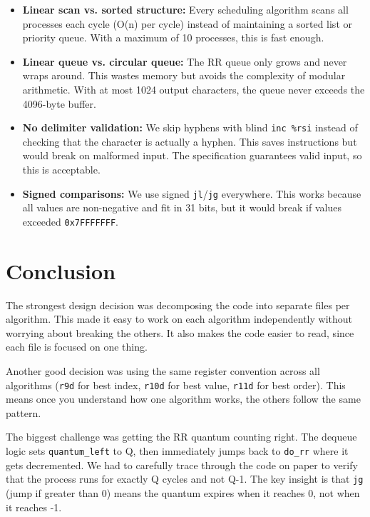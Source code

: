 \documentclass[a4paper,12pt]{article}
\begin{document}
\begin{itemize}
    \item \textbf{Linear scan vs. sorted structure:} Every scheduling algorithm scans all processes each cycle (O(n) per cycle) instead of maintaining a sorted list or priority queue. With a maximum of 10 processes, this is fast enough.
    \item \textbf{Linear queue vs. circular queue:} The RR queue only grows and never wraps around. This wastes memory but avoids the complexity of modular arithmetic. With at most 1024 output characters, the queue never exceeds the 4096-byte buffer.
    \item \textbf{No delimiter validation:} We skip hyphens with blind \texttt{inc \%rsi} instead of checking that the character is actually a hyphen. This saves instructions but would break on malformed input. The specification guarantees valid input, so this is acceptable.
    \item \textbf{Signed comparisons:} We use signed \texttt{jl}/\texttt{jg} everywhere. This works because all values are non-negative and fit in 31 bits, but it would break if values exceeded \texttt{0x7FFFFFFF}.
\end{itemize}

\section{Conclusion}

The strongest design decision was decomposing the code into separate files per algorithm. This made it easy to work on each algorithm independently without worrying about breaking the others. It also makes the code easier to read, since each file is focused on one thing.

Another good decision was using the same register convention across all algorithms (\texttt{r9d} for best index, \texttt{r10d} for best value, \texttt{r11d} for best order). This means once you understand how one algorithm works, the others follow the same pattern.

The biggest challenge was getting the RR quantum counting right. The dequeue logic sets \texttt{quantum\_left} to Q, then immediately jumps back to \texttt{do\_rr} where it gets decremented. We had to carefully trace through the code on paper to verify that the process runs for exactly Q cycles and not Q-1. The key insight is that \texttt{jg} (jump if greater than 0) means the quantum expires when it reaches 0, not when it reaches -1.
\end{document}
